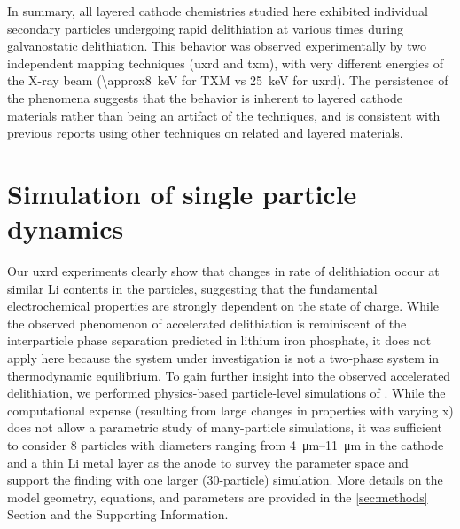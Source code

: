 \documentclass{article}
\begin{document}
In summary, all layered cathode chemistries studied here exhibited
individual secondary particles undergoing rapid delithiation at
various times during galvanostatic delithiation. This behavior was
observed experimentally by two independent mapping techniques
(\gls{uxrd} and \gls{txm}), with very different energies of the X-ray
beam (\SI{\approx8}{\kilo\electronvolt} for TXM vs
\SI{25}{\kilo\electronvolt} for \gls{uxrd}). The persistence of the
phenomena suggests that the behavior is inherent to layered cathode
materials rather than being an artifact of the techniques, and is
consistent with previous reports using other techniques on related
\nmc{} and  layered
materials\cite{chueh2021,rao2021,wang2020-6}.


\section{Simulation of single particle dynamics}


Our \gls{uxrd} experiments clearly show that changes in rate of
delithiation occur at similar Li contents in the particles, suggesting
that the fundamental electrochemical properties are strongly dependent
on the state of charge. While the observed phenomenon of accelerated
delithiation is reminiscent of the interparticle phase separation
predicted in lithium iron phosphate\cite{boesenberg2013,thornton2014},
it does not apply here because the system under investigation is not a
two-phase system in thermodynamic equilibrium. To gain further insight
into the observed accelerated delithiation, we performed physics-based
particle-level simulations of . While the computational expense
(resulting from large changes in properties with varying x) does not
allow a parametric study of many-particle simulations, it was
sufficient to consider 8 particles with diameters ranging from
\SIrange{4}{11}{\micro\meter} in the cathode and a thin Li metal layer
as the anode to survey the parameter space and support the finding
with one larger (30-particle) simulation. More details on the model
geometry, equations, and parameters are provided in the
\ref{sec:methods} Section and the Supporting Information.
\end{document}
